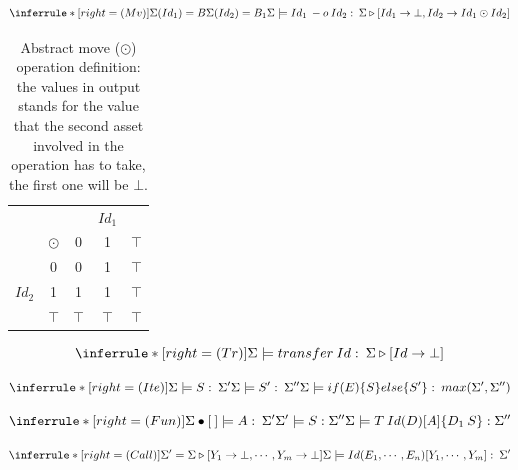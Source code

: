 \documentclass[11pt]{article} %
\begin{document}
\medskip

\[
\inferrule*[right=(Mv)]
{\Sigma(Id_1)= B \\ \Sigma(Id_2) =B_1  }
{\Sigma \models Id_1 \: -o \: Id_2 : \: \Sigma \triangleright [Id_1 \rightarrow \bot, Id_2 \rightarrow Id_1 \odot Id_2]}
\]

\medskip

\begin{table}[]
\begin{center}
\begin{tabular}{cc|ccc}
&          &     & $Id_1$ &       \\
&$ \odot $ & 0   & 1   & $\top$ \\ \hline
&0                    & 0   & 1   & $\top$                 \\
$Id_2$ &1                    & 1   & 1   & $\top$                \\ 
&$\top$ & $\top$ & $\top$ & $\top$             
\end{tabular}
\caption{Abstract move ($\odot$) operation definition: the values in output stands for the value that the second asset involved in the operation has to take, the first one will be $\bot$.}
\label{tab:abstMove}
\end{center}
\end{table}

\medskip

\[
\inferrule*[right=(Tr)]
{\\}
{\Sigma \models transfer \: Id : \: \Sigma \triangleright [Id\rightarrow \bot]}
\]

\medskip

\[
\inferrule*[right=(Ite)]
{\Sigma \models S : \: \Sigma' \\ \Sigma \models S': \: \Sigma''}
{\Sigma \models if (E) \{ S\} else\{S' \} : \: max(\Sigma',\Sigma'')}
\]

\medskip

\[
\inferrule*[right=(Fun)]{ 
\Sigma \bullet [\:] \models A : \: \Sigma' \\ \Sigma' \models S : \Sigma''}
{\Sigma \models T \: Id (D ) [A ] \{D_1  \: S \}: \Sigma'' }
\]

\medskip

\[
\inferrule*[right=(Call)]
{\Sigma' =\Sigma \triangleright [Y_1 \rightarrow \bot, \cdots, Y_m \rightarrow \bot]}
{\Sigma \models Id(E_1,\cdots,E_n)[Y_1,\cdots,Y_m]: \: \Sigma'}
\]
\end{document}

